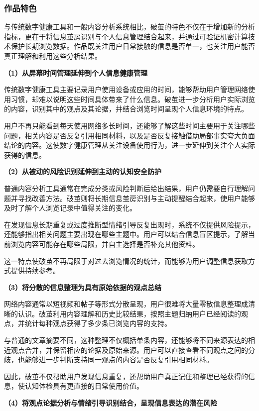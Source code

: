 \subsubsection{作品特色}\label{section:1.4.2}

与传统数字健康工具和一般内容分析系统相比，破茧的特色不仅在于增加新的分析指标，更在于将信息茧房识别与个人信息管理结合起来，并通过可验证机密计算技术保护长期浏览数据。作品既关注用户日常接触的信息是否单一，也关注用户能否真正理解和利用这些分析结果。

\textbf{（1）从屏幕时间管理延伸到个人信息健康管理}

传统数字健康工具主要记录用户使用设备或应用的时间，能够帮助用户管理网络使用习惯，却难以说明这些时间具体带来了什么信息。破茧进一步分析用户实际浏览的内容，识别其中的观点及其论据，并结合浏览时间呈现个人信息环境的特点。

用户不再只能看到每天使用网络多长时间，还能够了解这些时间主要用于关注哪些问题，相关内容是否反复引用相同材料，以及是否反复接触借助局部事实夸大负面结论的内容。这使数字健康管理从关注设备使用行为，进一步延伸到关注个人实际获得的信息。

\textbf{（2）从被动的风险识别延伸到主动的认知安全防护}

普通内容分析工具通常在完成分类或风险判断后给出结果，用户仍需要自行理解问题并寻找改善方法。破茧则将长期信息茧房识别与主动提醒结合起来，使用户能够及时了解个人浏览记录中值得关注的变化。

在发现信息长期重复或过度推断型情绪引导反复出现时，系统不仅提供风险提示，还能够指出相关问题主要出现在哪些主题中。用户可以结合信息盲区提示，了解当前浏览内容可能存在哪些局限，并自主选择是否补充其他资料。

这一特点使破茧不再局限于对过去浏览情况的统计，而能够为用户调整信息获取方式提供持续参考。

\textbf{（3）将分散的信息整理为具有原始依据的观点总结}

网络内容通常以短视频和帖子等形式分散呈现，用户很难将大量零散信息整理成清晰的认识。破茧利用内容理解和历史比较结果，按照主题归纳用户已经阅读的观点，并统计每种观点获得了多少条已浏览内容的支持。

与普通的文章摘要不同，这种整理不仅概括单条内容，还能够将不同来源表达的相近观点合并，并保留相应的论据及原始来源。用户可以直接查看不同观点之间的分歧，也能够进一步判断支持同一观点的内容是否反复引用相同材料。

因此，破茧不仅帮助用户发现信息重复，还帮助用户真正记住和整理已经获得的信息，使认知体检具有更直接的日常使用价值。

\textbf{（4）将观点论据分析与情绪引导识别结合，呈现信息表达的潜在风险}

